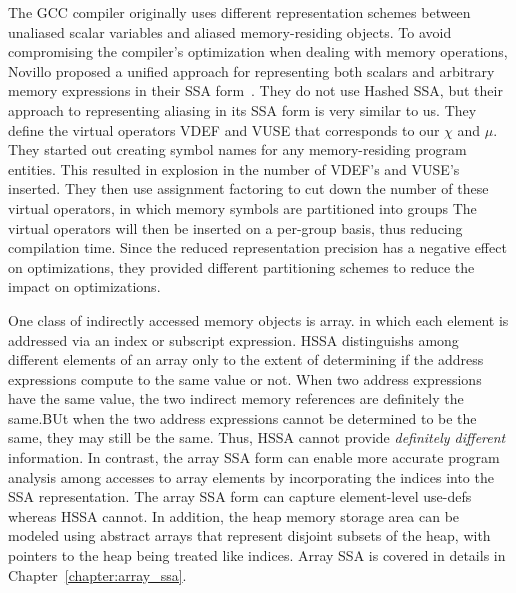 The GCC compiler originally uses different representation schemes between 
unaliased scalar variables and aliased memory-residing objects.
To avoid compromising the compiler's optimization when dealing with
memory operations, Novillo proposed a unified approach for representing both
scalars and arbitrary memory expressions in their SSA form~\cite{novillo2007}.
They do not use Hashed SSA, but their approach to representing 
aliasing in its SSA form is very similar to us.
They define the virtual operators VDEF and VUSE that corresponds to our 
$\chi$ and $\mu$.  They started out creating symbol names for any 
memory-residing program entities.  This resulted in explosion in the number of
VDEF's and VUSE's inserted.  They then use assignment factoring to cut down
the number of these virtual operators, in which memory symbols are partitioned
into groups  The virtual operators will then be inserted on a per-group basis,
thus reducing compilation time.  Since the reduced representation precision has
a negative effect on optimizations, they provided different partitioning
schemes to reduce the impact on optimizations.

One class of indirectly accessed memory objects is array. in which each element
is addressed via an index or subscript expression.  HSSA distinguishs among 
different elements of an array only to the extent of determining if the address
expressions compute to the same value or not.  When two address expressions
have the same value, the two indirect memory references are definitely the same.BUt when the two address expressions cannot be determined to be the same, they
may still be the same.  Thus, HSSA cannot provide \emph{definitely different}
information.  In contrast, the array SSA form can enable more accurate 
program analysis among accesses to array elements by incorporating the indices
into the SSA representation.  The array SSA form can capture element-level
use-defs whereas HSSA cannot. In addition, the heap memory storage area
can be modeled using abstract arrays that represent disjoint subsets of the 
heap, with pointers to the heap being treated like indices.
Array SSA is covered in details in Chapter~\ref{chapter:array_ssa}.  

